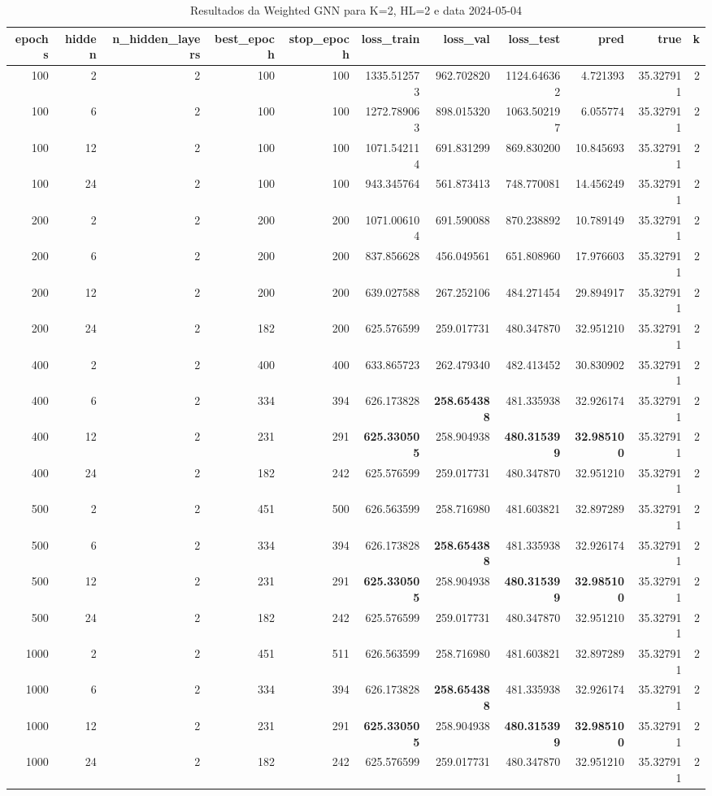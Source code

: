 \begin{table}
\caption{Resultados da Weighted GNN para K=2, HL=2 e data 2024-05-04}
\label{tab:weighted_gnn_results_k2_hl2_d20240504}
\begin{tabular}{rrrrrrrrrrr}
\toprule
epochs & hidden & n\_hidden\_layers & best\_epoch & stop\_epoch & loss\_train & loss\_val & loss\_test & pred & true & k \\
\midrule
100 & 2 & 2 & 100 & 100 & 1335.512573 & 962.702820 & 1124.646362 & 4.721393 & 35.327911 & 2 \\
100 & 6 & 2 & 100 & 100 & 1272.789063 & 898.015320 & 1063.502197 & 6.055774 & 35.327911 & 2 \\
100 & 12 & 2 & 100 & 100 & 1071.542114 & 691.831299 & 869.830200 & 10.845693 & 35.327911 & 2 \\
100 & 24 & 2 & 100 & 100 & 943.345764 & 561.873413 & 748.770081 & 14.456249 & 35.327911 & 2 \\
200 & 2 & 2 & 200 & 200 & 1071.006104 & 691.590088 & 870.238892 & 10.789149 & 35.327911 & 2 \\
200 & 6 & 2 & 200 & 200 & 837.856628 & 456.049561 & 651.808960 & 17.976603 & 35.327911 & 2 \\
200 & 12 & 2 & 200 & 200 & 639.027588 & 267.252106 & 484.271454 & 29.894917 & 35.327911 & 2 \\
200 & 24 & 2 & 182 & 200 & 625.576599 & 259.017731 & 480.347870 & 32.951210 & 35.327911 & 2 \\
400 & 2 & 2 & 400 & 400 & 633.865723 & 262.479340 & 482.413452 & 30.830902 & 35.327911 & 2 \\
400 & 6 & 2 & 334 & 394 & 626.173828 & \textbf{258.654388} & 481.335938 & 32.926174 & 35.327911 & 2 \\
400 & 12 & 2 & 231 & 291 & \textbf{625.330505} & 258.904938 & \textbf{480.315399} & \textbf{32.985100} & 35.327911 & 2 \\
400 & 24 & 2 & 182 & 242 & 625.576599 & 259.017731 & 480.347870 & 32.951210 & 35.327911 & 2 \\
500 & 2 & 2 & 451 & 500 & 626.563599 & 258.716980 & 481.603821 & 32.897289 & 35.327911 & 2 \\
500 & 6 & 2 & 334 & 394 & 626.173828 & \textbf{258.654388} & 481.335938 & 32.926174 & 35.327911 & 2 \\
500 & 12 & 2 & 231 & 291 & \textbf{625.330505} & 258.904938 & \textbf{480.315399} & \textbf{32.985100} & 35.327911 & 2 \\
500 & 24 & 2 & 182 & 242 & 625.576599 & 259.017731 & 480.347870 & 32.951210 & 35.327911 & 2 \\
1000 & 2 & 2 & 451 & 511 & 626.563599 & 258.716980 & 481.603821 & 32.897289 & 35.327911 & 2 \\
1000 & 6 & 2 & 334 & 394 & 626.173828 & \textbf{258.654388} & 481.335938 & 32.926174 & 35.327911 & 2 \\
1000 & 12 & 2 & 231 & 291 & \textbf{625.330505} & 258.904938 & \textbf{480.315399} & \textbf{32.985100} & 35.327911 & 2 \\
1000 & 24 & 2 & 182 & 242 & 625.576599 & 259.017731 & 480.347870 & 32.951210 & 35.327911 & 2 \\
\bottomrule
\end{tabular}
\end{table}

